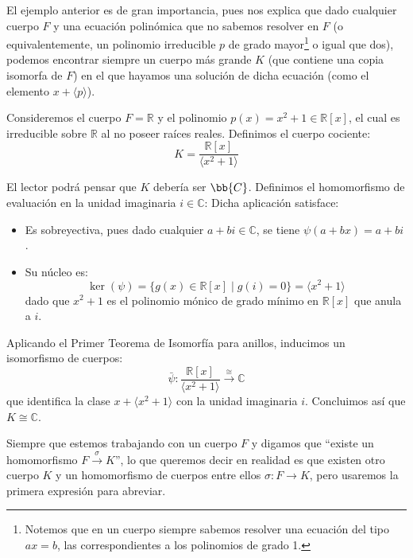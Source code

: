 \noindent
El ejemplo anterior es de gran importancia, pues nos explica que dado cualquier cuerpo $F$ y una ecuación polinómica que no sabemos resolver en $F$ (o equivalentemente, un polinomio irreducible $p$ de grado mayor\footnote{Notemos que en un cuerpo siempre sabemos resolver una ecuación del tipo $ax=b$, las correspondientes a los polinomios de grado 1.} o igual que dos), podemos encontrar siempre un cuerpo más grande $K$ (que contiene una copia isomorfa de $F$) en el que hayamos una solución de dicha ecuación (como el elemento $x+\langle p \rangle $).

\begin{ejemplo}
\noindent Consideremos el cuerpo $F = \mathbb{R}$ y el polinomio $p(x) = x^2 + 1 \in \mathbb{R}[x]$, el cual es irreducible sobre $\mathbb{R}$ al no poseer raíces reales. Definimos el cuerpo cociente:
\[
K = \frac{\mathbb{R}[x]}{\langle x^2 + 1 \rangle}
\]

El lector podrá pensar que $K$ debería ser $\bb{C}$.
    Definimos el homomorfismo de evaluación en la unidad imaginaria $i \in \mathbb{C}$:
    Dicha aplicación satisface:
    \begin{itemize}
        \item Es sobreyectiva, pues dado cualquier $a + bi \in \mathbb{C}$, se tiene $\psi(a + bx) = a + bi$.
        \item Su núcleo es:
        \[
        \ker(\psi) = \{g(x) \in \mathbb{R}[x] \mid g(i) = 0\} = \langle x^2 + 1 \rangle
        \]
        dado que $x^2 + 1$ es el polinomio mónico de grado mínimo en $\mathbb{R}[x]$ que anula a $i$.
    \end{itemize}
    Aplicando el Primer Teorema de Isomorfía para anillos, inducimos un isomorfismo de cuerpos:
    \[
    \bar{\psi} \colon \frac{\mathbb{R}[x]}{\langle x^2 + 1 \rangle} \overset{\cong}{\longrightarrow} \mathbb{C}
    \]
    que identifica la clase $x + \langle x^2 + 1 \rangle$ con la unidad imaginaria $i$. Concluimos así que $K \cong \mathbb{C}$.
\end{ejemplo}

\begin{notacion}
    Siempre que estemos trabajando con un cuerpo $F$ y digamos que ``existe un homomorfismo $F\stackrel{\sigma}{\to}K$'', lo que queremos decir en realidad es que existen otro cuerpo $K$ y un homomorfismo de cuerpos entre ellos $\sigma:F\to K$, pero usaremos la primera expresión para abreviar.
\end{notacion}

